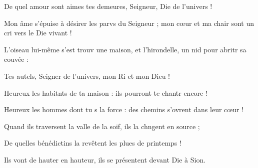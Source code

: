 \item De quel amour sont aimes tes demeures,\psstar{} Seigneur, Die de l’univers !
\item Mon âme s’épuise à désirer les parvs du Seigneur ;\psstar{} mon cœur et ma chair sont un cri vers le Die vivant !
\item L’oiseau lui-même s’est trouv une maison,\psstar{} et l’hirondelle, un nid pour abritr sa couvée : 
\item Tes autels, Seigner de l’univers,\psstar{} mon Ri et mon Dieu !
\item Heureux les habitnts de ta maison :\psstar{} ils pourront te chantr encore !
\item Heureux les hommes dont tu s la force :\psstar{} des chemins s’ovrent dans leur cœur !
\item Quand ils traversent la valle de la soif,\psstar{} ils la chngent en source ;
\item De quelles bénédictins la revêtent\psstar{} les plues de printemps !
\item Ils vont de hauter en hauteur,\psstar{} ils se présentent devant Die à Sion.
